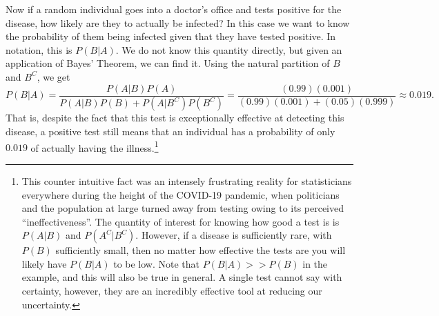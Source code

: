 \documentclass[
  letterpaper,
  DIV=11,
  numbers=noendperiod]{scrreprt}
\theoremstyle{definition}
\theoremstyle{definition}
\theoremstyle{definition}
\theoremstyle{remark}
\begin{document}
Now if a random individual goes into a doctor's office and tests
positive for the disease, how likely are they to actually be infected?
In this case we want to know the probability of them being infected
given that they have tested positive. In notation, this is \(P(B|A)\).
We do not know this quantity directly, but given an application of
Bayes' Theorem, we can find it. Using the natural partition of \(B\) and
\(B^C\), we get
\[P(B|A) = \frac{P(A|B)P(A)}{P(A|B)P(B)+P(A|B^C)P(B^C)} = \frac{(0.99)(0.001)}{(0.99)(0.001)+(0.05)(0.999)} \approx 0.019.\]
That is, despite the fact that this test is exceptionally effective at
detecting this disease, a positive test still means that an individual
has a probability of only \(0.019\) of actually having the
illness.\footnote{This counter intuitive fact was an intensely
  frustrating reality for statisticians everywhere during the height of
  the COVID-19 pandemic, when politicians and the population at large
  turned away from testing owing to its perceived ``ineffectiveness''.
  The quantity of interest for knowing how good a test is is \(P(A|B)\)
  and \(P(A^C|B^C)\). However, if a disease is sufficiently rare, with
  \(P(B)\) sufficiently small, then no matter how effective the tests
  are you will likely have \(P(B|A)\) to be low. Note that
  \(P(B|A) >> P(B)\) in the example, and this will also be true in
  general. A single test cannot say with certainty, however, they are an
  incredibly effective tool at reducing our uncertainty.}
\end{document}
